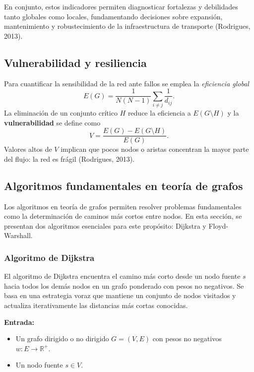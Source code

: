 \documentclass[11pt]{article}
\begin{document}
		En conjunto, estos indicadores permiten diagnosticar fortalezas y debilidades tanto globales como locales, fundamentando decisiones sobre expansión, mantenimiento y robustecimiento de la infraestructura de transporte (Rodrigues, 2013).


		\subsection{Vulnerabilidad y resiliencia}

		Para cuantificar la sensibilidad de la red ante fallos se emplea la \emph{eficiencia global}
		\begin{equation}
			E(G)=\frac{1}{N(N-1)}\sum_{i\neq j}\frac{1}{d_{ij}}.
		\end{equation}
		La eliminación de un conjunto crítico $H$ reduce la eficiencia a $E(G\setminus H)$ y la \textbf{vulnerabilidad} se define como
		\begin{equation}
			V=\frac{E(G)-E(G\setminus H)}{E(G)}.
		\end{equation}
		Valores altos de $V$ implican que pocos nodos o aristas concentran la mayor parte del flujo: la red es frágil (Rodrigues, 2013).

		\subsection{Algoritmos fundamentales en teoría de grafos}
			Los algoritmos en teoría de grafos permiten resolver problemas fundamentales como la determinación de caminos más cortos entre nodos. En esta sección, se presentan dos algoritmos esenciales para este propósito: Dijkstra y Floyd-Warshall.

			\subsubsection{Algoritmo de Dijkstra}

			El algoritmo de Dijkstra encuentra el camino más corto desde un nodo fuente $s$ hacia todos los demás nodos en un grafo ponderado con pesos no negativos. Se basa en una estrategia voraz que mantiene un conjunto de nodos visitados y actualiza iterativamente las distancias más cortas conocidas.

			\textbf{Entrada:}
			\begin{itemize}
				\item Un grafo dirigido o no dirigido $G = (V, E)$ con pesos no negativos $w: E \to \mathbb{R}^+$.
				\item Un nodo fuente $s \in V$.
			\end{itemize}
\end{document}
